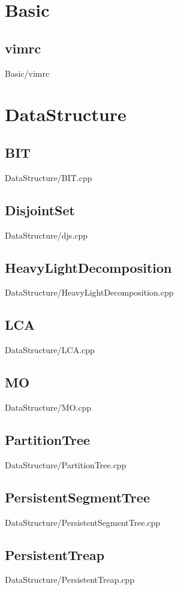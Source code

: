 \section{Basic}
    \subsection{vimrc}
         {Basic/vimrc}
\section{DataStructure}
    \subsection{BIT}
         {DataStructure/BIT.cpp}
    \subsection{DisjointSet}
         {DataStructure/djs.cpp}
    \subsection{HeavyLightDecomposition}
         {DataStructure/HeavyLightDecomposition.cpp}
    \subsection{LCA}
         {DataStructure/LCA.cpp}
    \subsection{MO}
         {DataStructure/MO.cpp}
    \subsection{PartitionTree}
         {DataStructure/PartitionTree.cpp}
    \subsection{PersistentSegmentTree}
         {DataStructure/PersistentSegmentTree.cpp}
    \subsection{PersistentTreap}
         {DataStructure/PersistentTreap.cpp}
